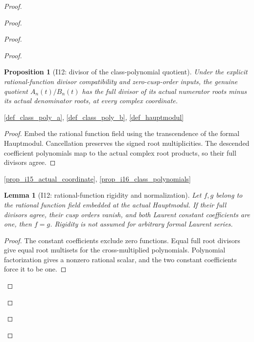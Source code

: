 \documentclass[11pt,a4paper]{article}
\numberwithin{equation}{section}
\theoremstyle{plain}\newtheorem{theorem}{Theorem}[section]\newaliascnt{proposition}{theorem}\newtheorem{proposition}[proposition]{Proposition}\aliascntresetthe{proposition}\newaliascnt{lemma}{theorem}\newtheorem{lemma}[lemma]{Lemma}\aliascntresetthe{lemma}
\theoremstyle{definition}\newaliascnt{definition}{theorem}\newtheorem{definition}[definition]{Definition}\aliascntresetthe{definition}\newaliascnt{notation}{theorem}\newtheorem{notation}[notation]{Notation}\aliascntresetthe{notation}
\providecommand{\lean}[1]{}\providecommand{\leanok}{}
\begin{document}
\begin{proof}
\begin{proof}
\begin{proof}
\begin{proof}
\begin{proposition}[I12: divisor of the class-polynomial quotient]\label{prop_i12_class_quotient_divisor}\lean{SptCM.Analytic.Repaired.classPolynomialQuotient_divisor}\leanok
Under the explicit rational-function divisor compatibility and zero-cusp-order inputs, the genuine quotient $A_n(t)/B_n(t)$ has the full divisor of its actual numerator roots minus its actual denominator roots, at every complex coordinate.
\end{proposition}
\begin{uses-statement}\ref{def_class_poly_a}, \ref{def_class_poly_b}, \ref{def_hauptmodul}\end{uses-statement}
\begin{proof}Embed the rational function field using the transcendence of the formal Hauptmodul. Cancellation preserves the signed root multiplicities. The descended coefficient polynomials map to the actual complex root products, so their full divisors agree.\end{proof}
\begin{uses-proof}\ref{prop_i15_actual_coordinate}, \ref{prop_i16_class_polynomials}\end{uses-proof}

\begin{lemma}[I12: rational-function rigidity and normalization]\label{lem_i12_cusp_rigidity}\lean{SptCM.Analytic.Repaired.eq_of_rational_divisors_and_normalization}\leanok
Let $f,g$ belong to the rational function field embedded at the actual Hauptmodul. If their full divisors agree, their cusp orders vanish, and both Laurent constant coefficients are one, then $f=g$. Rigidity is not assumed for arbitrary formal Laurent series.
\end{lemma}
\begin{proof}The constant coefficients exclude zero functions. Equal full root divisors give equal root multisets for the cross-multiplied polynomials. Polynomial factorization gives a nonzero rational scalar, and the two constant coefficients force it to be one.\end{proof}



\end{proof}
\end{proof}
\end{proof}
\end{proof}
\end{document}
